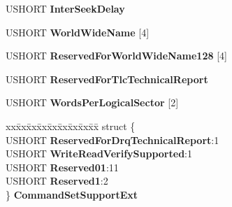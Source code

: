 \begin{DoxyCompactItemize}
\begin{tabbing}
\end{tabbing}\item 
\mbox{\label{struct___i_d_e_n_t_i_f_y___d_e_v_i_c_e___d_a_t_a_a54c4fb353f40ecf7dd9da371d124a867}} 
U\+S\+H\+O\+RT {\bfseries Inter\+Seek\+Delay}
\item 
\mbox{\label{struct___i_d_e_n_t_i_f_y___d_e_v_i_c_e___d_a_t_a_a139d843e3d15ead2b491d5638feec0a5}} 
U\+S\+H\+O\+RT {\bfseries World\+Wide\+Name} \mbox{[}4\mbox{]}
\item 
\mbox{\label{struct___i_d_e_n_t_i_f_y___d_e_v_i_c_e___d_a_t_a_a4c7d68d86b8649e8cd4cfe7b1100b4a5}} 
U\+S\+H\+O\+RT {\bfseries Reserved\+For\+World\+Wide\+Name128} \mbox{[}4\mbox{]}
\item 
\mbox{\label{struct___i_d_e_n_t_i_f_y___d_e_v_i_c_e___d_a_t_a_a68d8c2e083a33ff52c7b29048bd52f14}} 
U\+S\+H\+O\+RT {\bfseries Reserved\+For\+Tlc\+Technical\+Report}
\item 
\mbox{\label{struct___i_d_e_n_t_i_f_y___d_e_v_i_c_e___d_a_t_a_a156bb184450fb253a80cc3130fa0486f}} 
U\+S\+H\+O\+RT {\bfseries Words\+Per\+Logical\+Sector} \mbox{[}2\mbox{]}
\item 
\mbox{\label{struct___i_d_e_n_t_i_f_y___d_e_v_i_c_e___d_a_t_a_af1e9080043d36290f351ada2ac4075ce}} 
\begin{tabbing}
xx\=xx\=xx\=xx\=xx\=xx\=xx\=xx\=xx\=\kill
struct \{\\
\>USHORT {\bfseries ReservedForDrqTechnicalReport}:1\\
\>USHORT {\bfseries WriteReadVerifySupported}:1\\
\>USHORT {\bfseries Reserved01}:11\\
\>USHORT {\bfseries Reserved1}:2\\
\} {\bfseries CommandSetSupportExt}\\


\end{tabbing}
\end{DoxyCompactItemize}
